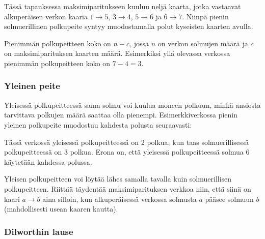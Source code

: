 Tässä tapauksessa maksimiparitukseen kuuluu neljä kaarta,
jotka vastaavat alkuperäisen verkon kaaria
$1 \rightarrow 5$, $3 \rightarrow 4$,
$5 \rightarrow 6$ ja $6 \rightarrow 7$.
Niinpä pienin solmuerillinen polkupeite syntyy muodostamalla
polut kyseisten kaarten avulla.

Pienimmän polkupeitteen koko on $n-c$, jossa $n$ on verkon
solmujen määrä ja $c$ on maksimiparituksen kaarten määrä.
Esimerkiksi yllä olevassa verkossa pienimmän
polkupeitteen koko on $7-4=3$.

\subsubsection{Yleinen peite}

Yleisessä polkupeitteessä sama solmu voi kuulua moneen polkuun,
minkä ansiosta tarvittava polkujen määrä saattaa olla pienempi.
Esimerkkiverkossa pienin yleinen polkupeite muodostuu
kahdesta polusta seuraavasti:

\begin{center}
\end{center}

Tässä verkossä yleisessä polkupeitteessä on 2 polkua,
kun taas solmuerillisessä polkupeitteessä on 3 polkua.
Erona on, että yleisessä polkupeitteessä solmua 6
käytetään kahdessa polussa.

Yleisen polkupeitteen voi löytää lähes samalla
tavalla kuin solmuerillisen polkupeitteen.
Riittää täydentää maksimiparituksen verkkoa niin,
että siinä on kaari $a \rightarrow b$ aina silloin,
kun alkuperäisessä verkossa solmusta $a$ pääsee
solmuun $b$ (mahdollisesti usean kaaren kautta).

\subsubsection{Dilworthin lause}


